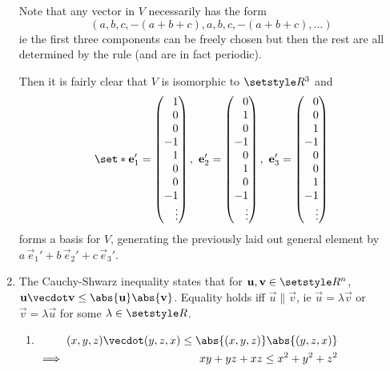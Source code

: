 \documentclass[fleqn,a4paper,11pt]{article}
\begin{document}
\begin{enumerate}[label=\textbf{\arabic*.}]
    Note that any vector in \(V\) necessarily has the form
    \begin{equation*}
     (a, b, c, -(a + b + c), a, b, c, -(a + b + c), \dotsc)
    \end{equation*}
    ie the first three components can be freely chosen but then the rest are all
    determined by the rule (and are in fact periodic).

    Then it is fairly clear that \(V\) is isomorphic to \(\Reals^3\) and
    \begin{equation*}
     \set*{
      \vec e_1'
       =
       \begin{pmatrix*}[r]
        1 \\ 0 \\ 0 \\ -1 \\ 1 \\ 0 \\ 0 \\ -1 \\ \vdots
       \end{pmatrix*},
    \ \vec e_2'
       =
       \begin{pmatrix*}[r]
        0 \\ 1 \\ 0 \\ -1 \\ 0 \\ 1 \\ 0 \\ -1 \\ \vdots
       \end{pmatrix*},
    \ \vec e_3'
       =
       \begin{pmatrix*}[r]
        0 \\ 0 \\ 1 \\ -1 \\ 0 \\ 0 \\ 1 \\ -1 \\ \vdots
       \end{pmatrix*}
      }
    \end{equation*}
    forms a basis for \(V\), generating the previously laid out general element
    by \(a\,\vec e_1' + b\,\vec e_2' + c\,\vec e_3'\).
   \item
    The Cauchy-Shwarz inequality states that for
    \(\vec u, \vec v \in \Reals^n\),
    \(\vec u \vecdot \vec v \le \abs{\vec u} \abs{\vec v}\).
    Equality holds iff \(\vec u \parallel \vec v\), ie
    \(\vec u = \lambda \vec v\) or \(\vec v = \lambda \vec u\) for some
    \(\lambda \in \Reals\).
    \begin{enumerate}[label=(\alph*)]
     \item \(
      \begin{alignedat}[t]2
       && (x, y, z) \vecdot (y, z, x) \le \abs{(x, y, z)} \abs{(y, z, x)} \\
       \implies{}&& xy + yz + xz \le x^2 + y^2 + z^2
      \end{alignedat} \)


\end{enumerate}
\end{enumerate}
\end{document}
